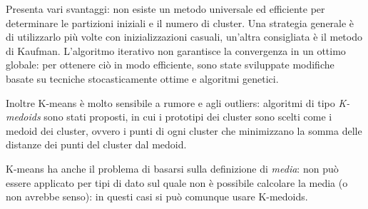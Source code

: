 \documentclass[\main/main.tex]{subfiles}
\begin{document}
Presenta vari svantaggi: non esiste un metodo universale ed efficiente per determinare le partizioni iniziali e il numero di cluster. Una strategia generale è di utilizzarlo più volte con inizializzazioni casuali, un'altra consigliata è il metodo di Kaufman. L'algoritmo iterativo non garantisce la convergenza in un ottimo globale: per ottenere ciò in modo efficiente, sono state sviluppate modifiche basate su tecniche stocasticamente ottime e algoritmi genetici.

Inoltre K-means è molto sensibile a rumore e agli outliers: algoritmi di tipo \textit{K-medoids} sono stati proposti, in cui i prototipi dei cluster sono scelti come i medoid dei cluster, ovvero i punti di ogni cluster che minimizzano la somma delle distanze dei punti del cluster dal medoid.

K-means ha anche il problema di basarsi sulla definizione di \textit{media}: non può essere applicato per tipi di dato sul quale non è possibile calcolare la media (o non avrebbe senso): in questi casi si può comunque usare K-medoids.
\end{document}
